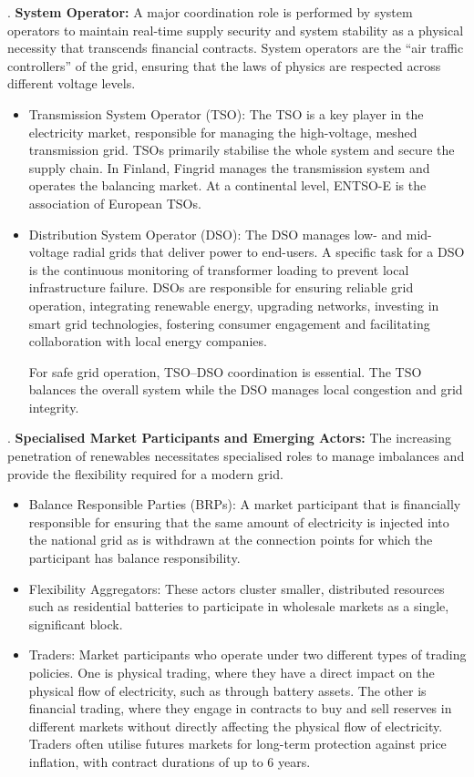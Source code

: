 . \textbf{System Operator:} A major coordination role is performed by system operators to maintain real-time supply security and system stability as a physical necessity that transcends financial contracts. System operators are the ``air traffic controllers'' of the grid, ensuring that the laws of physics are respected across different voltage levels.
    \begin{itemize}
    \item Transmission System Operator (TSO): The TSO is a key player in the electricity market, responsible for managing the high-voltage, meshed transmission grid. TSOs primarily stabilise the whole system and secure the supply chain. In Finland, Fingrid manages the transmission system and operates the balancing market. At a continental level, ENTSO-E is the association of European TSOs.
    \item Distribution System Operator (DSO): The DSO manages low- and mid-voltage radial grids that deliver power to end-users. A specific task for a DSO is the continuous monitoring of transformer loading to prevent local infrastructure failure. DSOs are responsible for ensuring reliable grid operation, integrating renewable energy, upgrading networks, investing in smart grid technologies, fostering consumer engagement and facilitating collaboration with local energy companies.

    For safe grid operation, TSO--DSO coordination is essential. The TSO balances the overall system while the DSO manages local congestion and grid integrity.
\end{itemize}

. \textbf{Specialised Market Participants and Emerging Actors:} The increasing penetration of renewables necessitates specialised roles to manage imbalances and provide the flexibility required for a modern grid.
    \begin{itemize}
        \item Balance Responsible Parties (BRPs): A market participant that is financially responsible for ensuring that the same amount of electricity is injected into the national grid as is withdrawn at the connection points for which the participant has balance responsibility.
        \item Flexibility Aggregators: These actors cluster smaller, distributed resources such as residential batteries to participate in wholesale markets as a single, significant block.
        \item Traders: Market participants who operate under two different types of trading policies. One is physical trading, where they have a direct impact on the physical flow of electricity, such as through battery assets. The other is financial trading, where they engage in contracts to buy and sell reserves in different markets without directly affecting the physical flow of electricity. Traders often utilise futures markets for long-term protection against price inflation, with contract durations of up to 6 years.
    \end{itemize}


